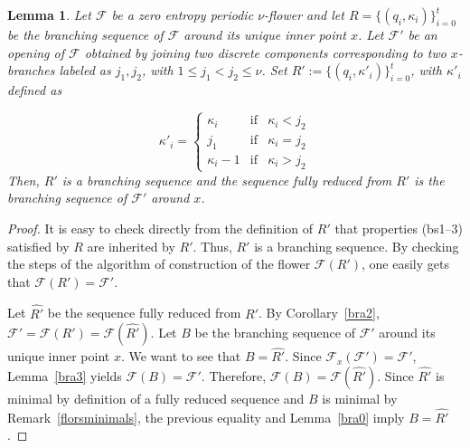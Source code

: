 \documentclass[a4paper]{amsart}
\newtheorem{lemma}[theorem]{Lemma}
\theoremstyle{definition}
\begin{document}
\begin{lemma}\label{2flors}
Let $\mathcal{F}$ be a zero entropy periodic $\nu$-flower and let $R=\{(q_i,\kappa_i)\}_{i=0}^t$ be the branching sequence of $\mathcal{F}$ around its unique inner point $x$. Let $\mathcal{F}'$ be an opening of $\mathcal{F}$ obtained by joining two discrete components corresponding to two $x$-branches labeled as $j_1,j_2$, with $1\le j_1<j_2\le\nu$. Set $R':=\{(q_i,\kappa'_i)\}_{i=0}^t$, with $\kappa'_i$ defined as

\[ \kappa'_i=\left\{ \begin{array}{lcl}
\kappa_i & \mbox{if} & \kappa_i<j_2 \\
j_1 & \mbox{if} & \kappa_i=j_2 \\
\kappa_i-1 & \mbox{if} & \kappa_i>j_2
\end{array}\right. \]
Then, $R'$ is a branching sequence and the sequence fully reduced from $R'$ is the branching sequence of $\mathcal{F}'$ around $x$.
\end{lemma}
\begin{proof}
It is easy to check directly from the definition of $R'$ that properties (bs1--3) satisfied by $R$ are inherited by $R'$. Thus, $R'$ is a branching sequence. By checking the steps of the algorithm of construction of the flower $\mathcal{F}(R')$, one easily gets that $\mathcal{F}(R')=\mathcal{F}'$.

Let $\widehat{R'}$ be the sequence fully reduced from $R'$. By Corollary~\ref{bra2}, $\mathcal{F}'=\mathcal{F}(R')=\mathcal{F}(\widehat{R'})$. Let $B$ be the branching sequence of $\mathcal{F}'$ around its unique inner point $x$. We want to see that $B=\widehat{R'}$. Since $\mathcal{F}_x(\mathcal{F}')=\mathcal{F}'$, Lemma~\ref{bra3} yields $\mathcal{F}(B)=\mathcal{F}'$. Therefore, $\mathcal{F}(B)=\mathcal{F}(\widehat{R'})$. Since $\widehat{R'}$ is minimal by definition of a fully reduced sequence and $B$ is minimal by Remark~\ref{florsminimals}, the previous equality and Lemma~\ref{bra0} imply $B=\widehat{R'}$.
\end{proof}
\end{document}
